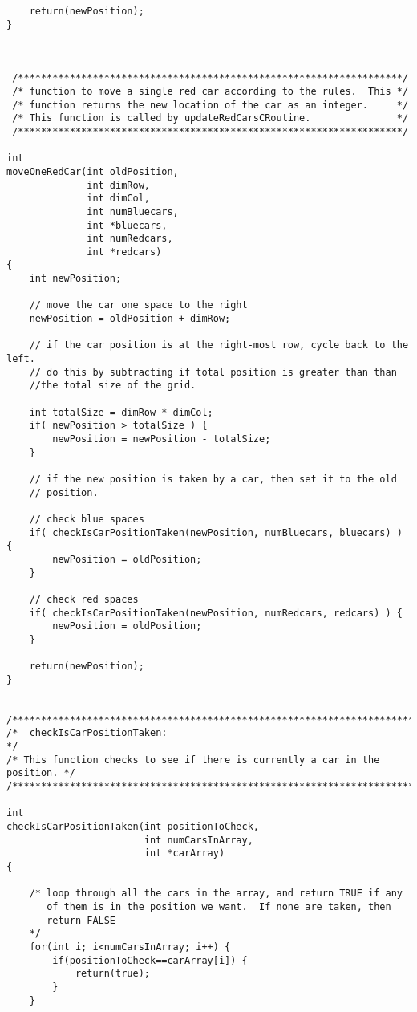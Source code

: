 \documentclass[11pt]{article}
\begin{document}
\begin{verbatim}
    return(newPosition);
}



 /*******************************************************************/
 /* function to move a single red car according to the rules.  This */
 /* function returns the new location of the car as an integer.     */
 /* This function is called by updateRedCarsCRoutine.               */
 /*******************************************************************/

int
moveOneRedCar(int oldPosition,
              int dimRow,
              int dimCol,
              int numBluecars,
              int *bluecars,
              int numRedcars,
              int *redcars) 
{
    int newPosition;

    // move the car one space to the right
    newPosition = oldPosition + dimRow;

    // if the car position is at the right-most row, cycle back to the left.
    // do this by subtracting if total position is greater than than
    //the total size of the grid.

    int totalSize = dimRow * dimCol;
    if( newPosition > totalSize ) {
        newPosition = newPosition - totalSize;
    }

    // if the new position is taken by a car, then set it to the old
    // position.

    // check blue spaces
    if( checkIsCarPositionTaken(newPosition, numBluecars, bluecars) ) {
        newPosition = oldPosition;
    }

    // check red spaces
    if( checkIsCarPositionTaken(newPosition, numRedcars, redcars) ) {
        newPosition = oldPosition;
    }

    return(newPosition);
}


/****************************************************************************/
/*  checkIsCarPositionTaken:                                                */
/* This function checks to see if there is currently a car in the position. */
/****************************************************************************/

int
checkIsCarPositionTaken(int positionToCheck,
                        int numCarsInArray,
                        int *carArray)
{

    /* loop through all the cars in the array, and return TRUE if any
       of them is in the position we want.  If none are taken, then
       return FALSE 
    */ 
    for(int i; i<numCarsInArray; i++) {
        if(positionToCheck==carArray[i]) {
            return(true);
        }
    }


\end{verbatim}
\end{document}
